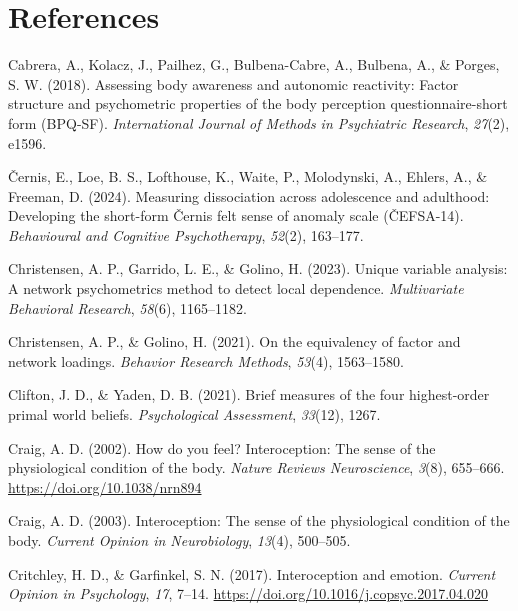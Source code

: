 \documentclass[
  jou,
  floatsintext,
  longtable,
  nolmodern,
  notxfonts,
  notimes,
  colorlinks=true,linkcolor=blue,citecolor=blue,urlcolor=blue]{apa7}
\newlength{\cslhangindent}
\newenvironment{CSLReferences}[2] %
 {\begin{list}{}{%
  \setlength{\itemindent}{0pt}
  \setlength{\leftmargin}{0pt}
  \setlength{\parsep}{0pt}
  \ifodd #1
   \setlength{\leftmargin}{\cslhangindent}
   \setlength{\itemindent}{-1\cslhangindent}
  \fi
  \setlength{\itemsep}{#2\baselineskip}}}
 {\end{list}}
\begin{document}
\section{References}\label{references}

\label{refs}
\begin{CSLReferences}{1}{0}
Cabrera, A., Kolacz, J., Pailhez, G., Bulbena-Cabre, A., Bulbena, A., \&
Porges, S. W. (2018). Assessing body awareness and autonomic reactivity:
Factor structure and psychometric properties of the body perception
questionnaire-short form (BPQ-SF). \emph{International Journal of
Methods in Psychiatric Research}, \emph{27}(2), e1596.

Černis, E., Loe, B. S., Lofthouse, K., Waite, P., Molodynski, A.,
Ehlers, A., \& Freeman, D. (2024). Measuring dissociation across
adolescence and adulthood: Developing the short-form {Č}ernis felt sense
of anomaly scale ({Č}EFSA-14). \emph{Behavioural and Cognitive
Psychotherapy}, \emph{52}(2), 163--177.

Christensen, A. P., Garrido, L. E., \& Golino, H. (2023). Unique
variable analysis: A network psychometrics method to detect local
dependence. \emph{Multivariate Behavioral Research}, \emph{58}(6),
1165--1182.

Christensen, A. P., \& Golino, H. (2021). On the equivalency of factor
and network loadings. \emph{Behavior Research Methods}, \emph{53}(4),
1563--1580.

Clifton, J. D., \& Yaden, D. B. (2021). Brief measures of the four
highest-order primal world beliefs. \emph{Psychological Assessment},
\emph{33}(12), 1267.

Craig, A. D. (2002). How do you feel? Interoception: The sense of the
physiological condition of the body. \emph{Nature Reviews Neuroscience},
\emph{3}(8), 655--666. \url{https://doi.org/10.1038/nrn894}

Craig, A. D. (2003). Interoception: The sense of the physiological
condition of the body. \emph{Current Opinion in Neurobiology},
\emph{13}(4), 500--505.

Critchley, H. D., \& Garfinkel, S. N. (2017). Interoception and emotion.
\emph{Current Opinion in Psychology}, \emph{17}, 7--14.
\url{https://doi.org/10.1016/j.copsyc.2017.04.020}


\end{CSLReferences}
\end{document}
